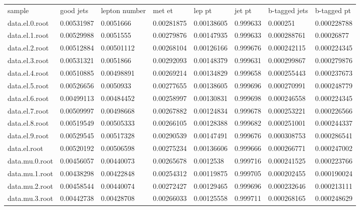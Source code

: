 \begin{table}[]
    \begin{tabular}{llllllll}
    sample             & good jets & lepton number & met et & lep pt      & jet pt   &  b-tagged jets & b-tagged pt \\
    data.el.0.root     & 0.00531987 & 0.0051666  & 0.00281875 & 0.00138605  & 0.999633 & 0.000251    & 0.000228788   \\
    data.el.1.root     & 0.00529988 & 0.0051555  & 0.00279876 & 0.00147935  & 0.999633 & 0.000288761 & 0.00026877    \\
    data.el.2.root     & 0.00512884 & 0.00501112 & 0.00268104 & 0.00126166  & 0.999676 & 0.000242115 & 0.000224345   \\
    data.el.3.root     & 0.00531321 & 0.0051866  & 0.00292093 & 0.00148379  & 0.999631 & 0.000299867 & 0.000279876   \\
    data.el.4.root     & 0.00510885 & 0.00498891 & 0.00269214 & 0.00134829  & 0.999658 & 0.000255443 & 0.000237673   \\
    data.el.5.root     & 0.00526656 & 0.0050933  & 0.00277655 & 0.00138605  & 0.999696 & 0.000270991 & 0.000248779   \\
    data.el.6.root     & 0.00499113 & 0.00484452 & 0.00258997 & 0.00130831  & 0.999698 & 0.000246558 & 0.000224345   \\
    data.el.7.root     & 0.00509997 & 0.00498668 & 0.00267882 & 0.00124834  & 0.999678 & 0.000253221 & 0.000226566   \\
    data.el.8.root     & 0.00519549 & 0.00505333 & 0.00266105 & 0.00128388  & 0.999682 & 0.000251001 & 0.000244337   \\
    data.el.9.root     & 0.00529545 & 0.00517328 & 0.00290539 & 0.00147491  & 0.999676 & 0.000308753 & 0.000286541   \\
    data.el.root       & 0.00520192 & 0.00506598 & 0.00275234 & 0.00136606  & 0.999666 & 0.000266771 & 0.000247002   \\
    data.mu.0.root     & 0.00456057 & 0.00440073 & 0.00265678 & 0.0012538   & 0.999716 & 0.000241525 & 0.000223766   \\
    data.mu.1.root     & 0.00438298 & 0.00422848 & 0.00254312 & 0.00119875  & 0.999705 & 0.000202455 & 0.000190024   \\
    data.mu.2.root     & 0.00458544 & 0.00440074 & 0.00272427 & 0.00129465  & 0.999696 & 0.000232646 & 0.000213111   \\
    data.mu.3.root     & 0.00442738 & 0.00428708 & 0.00266033 & 0.00125558  & 0.999711 & 0.000268165 & 0.000248629   \\

\end{tabular}
\end{table}
